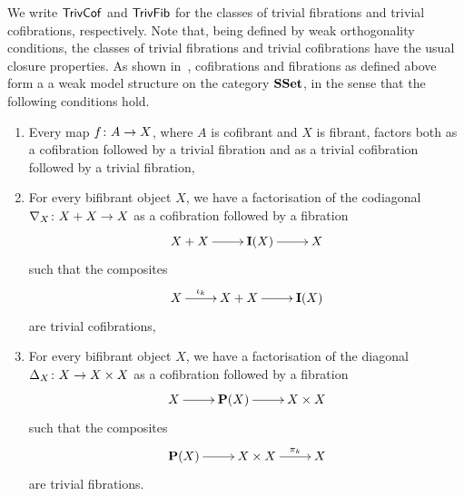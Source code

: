 \documentclass[reqno,10pt,a4paper,oneside,draft]{amsart}
\begin{document}
We write $\mathsf{TrivCof}$ and $\mathsf{TrivFib}$ for the classes of trivial fibrations and trivial cofibrations, respectively.
Note that, being defined by weak orthogonality conditions, the classes of trivial fibrations
and trivial cofibrations have the usual closure properties. As shown in~\cite{henry2018wms}, cofibrations and fibrations as defined above form a  a weak model structure on the category $\mathbf{SSet}$, in the sense that the following conditions hold.
\begin{enumerate}[$(\mathrm{WM}1)$]
\item Every map $f \colon A \to X$, where $A$ is cofibrant and $X$ is fibrant, factors both as a
cofibration followed by a trivial fibration and as a trivial cofibration followed by a trivial fibration,
\item For every bifibrant object $X$, we have a factorisation of the codiagonal $\nabla_X \colon 
X + X \to X$ as a cofibration followed by a fibration 
\[
\xymatrix{X + X \ar[r] &  {\bf I}(X) \ar[r] & X}
\]
such that the composites 
\[
\xymatrix{X \ar[r]^-{\iota_k}  & X+X \ar[r] & {\bf I }(X)}
\]
are trivial cofibrations,
\item For every bifibrant object $X$, we have a factorisation of the diagonal $\Delta_X \colon X \to 
X \times X$ as a cofibration followed by a fibration
\[
\xymatrix{X  \ar[r]  & {\bf P}(X) \ar[r] & X \times X }
 \]
 such that the composites
\[
\xymatrix{ {\bf P}(X) \ar[r] &  X \times X \ar[r]^-{\pi_k} &  X }
\]
are trivial fibrations.
\end{enumerate}
\end{document}
